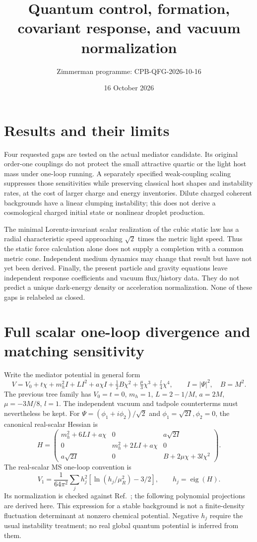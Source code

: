 \documentclass[11pt]{article}
\title{Quantum control, formation, covariant response, and vacuum normalization}
\author{Zimmerman programme: CPB-QFG-2026-10-16}
\date{16 October 2026}
\begin{document}
\maketitle
\section{Results and their limits}
Four requested gaps are tested on the actual mediator candidate. Its
original order-one couplings do not protect the small attractive quartic
or the light host mass under one-loop running. A separately specified
weak-coupling scaling suppresses those sensitivities while preserving
classical host shapes and instability rates, at the cost of larger charge
and energy inventories. Dilute charged coherent backgrounds have a linear
clumping instability; this does not derive a cosmological charged initial
state or nonlinear droplet production.

The minimal Lorentz-invariant scalar realization of the cubic static law
has a radial characteristic speed approaching $\sqrt2$ times the metric
light speed. Thus the static force calculation alone does not supply a
completion with a common metric cone. Independent medium dynamics may
change that result but have not yet been derived. Finally, the present
particle and gravity equations leave independent response coefficients and
vacuum flux/history data. They do not predict a unique dark-energy density
or acceleration normalization. None of these gaps is relabeled as closed.

\section{Full scalar one-loop divergence and matching sensitivity}
Write the mediator potential in general form
\begin{equation}
 V=V_0+t\chi+m_h^2 I+L I^2+a\chi I+
 \tfrac12 B\chi^2+\tfrac\mu3\chi^3+\tfrac l4\chi^4,
 \qquad I=|\Psi|^2,\quad B=M^2.
\end{equation}
The previous tree family has $V_0=t=0$, $m_h=1$,
$L=2-1/M$, $a=2M$, $\mu=-3M/8$, $l=1$.
The independent vacuum and tadpole counterterms must nevertheless be kept.
For $\Psi=(\phi_1+i\phi_2)/\sqrt2$ and
$\phi_1=\sqrt{2I},\phi_2=0$, the canonical real-scalar Hessian is
\begin{equation}
 H=\begin{pmatrix}
 m_h^2+6LI+a\chi&0&a\sqrt{2I}\\
 0&m_h^2+2LI+a\chi&0\\
 a\sqrt{2I}&0&B+2\mu\chi+3l\chi^2
 \end{pmatrix}.
\end{equation}
The real-scalar MS one-loop convention is
\begin{equation}
 V_1=\frac{1}{64\pi^2}\sum_j h_j^2
       [\ln(h_j/\mu_R^2)-3/2],\qquad h_j=\operatorname{eig}(H).
\end{equation}
Its normalization is checked against Ref.~\cite{qfg:Martin}; the following
polynomial projections are derived here. This expression for a stable
background is not a finite-density fluctuation determinant at nonzero
chemical potential. Negative $h_j$ require the usual instability treatment;
no real global quantum potential is inferred from them.
\end{document}
